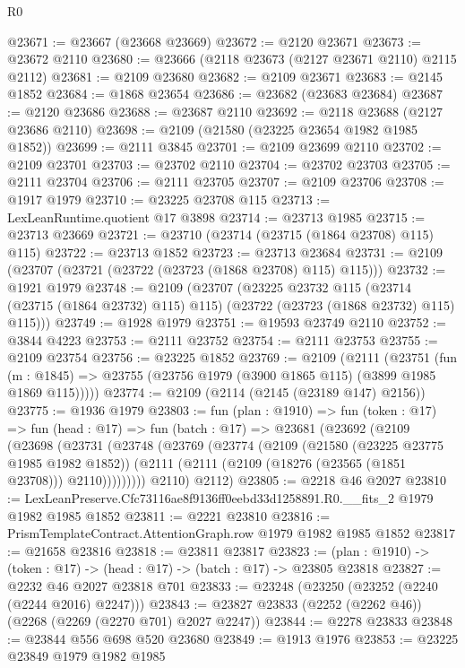 \begin{lexlean}{R0}
\begin{coremodule}
@23671 := @23667 (@23668 @23669)
@23672 := @2120 @23671
@23673 := @23672 @2110
@23680 := @23666 (@2118 @23673 (@2127 @23671 @2110) @2115 @2112)
@23681 := @2109 @23680
@23682 := @2109 @23671
@23683 := @2145 @1852
@23684 := @1868 @23654
@23686 := @23682 (@23683 @23684)
@23687 := @2120 @23686
@23688 := @23687 @2110
@23692 := @2118 @23688 (@2127 @23686 @2110)
@23698 := @2109 (@21580 (@23225 @23654 @1982 @1985 @1852))
@23699 := @2111 @3845
@23701 := @2109 @23699 @2110
@23702 := @2109 @23701
@23703 := @23702 @2110
@23704 := @23702 @23703
@23705 := @2111 @23704
@23706 := @2111 @23705
@23707 := @2109 @23706
@23708 := @1917 @1979
@23710 := @23225 @23708 @115
@23713 := LexLeanRuntime.quotient @17 @3898
@23714 := @23713 @1985
@23715 := @23713 @23669
@23721 := @23710 (@23714 (@23715 (@1864 @23708) @115) @115)
@23722 := @23713 @1852
@23723 := @23713 @23684
@23731 := @2109 (@23707 (@23721 (@23722 (@23723 (@1868 @23708) @115) @115)))
@23732 := @1921 @1979
@23748 := @2109
    (@23707
      (@23225
        @23732
        @115
        (@23714 (@23715 (@1864 @23732) @115) @115)
        (@23722 (@23723 (@1868 @23732) @115) @115)))
@23749 := @1928 @1979
@23751 := @19593 @23749 @2110
@23752 := @3844 @4223
@23753 := @2111 @23752
@23754 := @2111 @23753
@23755 := @2109 @23754
@23756 := @23225 @1852
@23769 := @2109
    (@2111
      (@23751
        (fun (m : @1845) => @23755 (@23756 @1979 (@3900 @1865 @115) (@3899 @1985 @1869 @115)))))
@23774 := @2109 (@2114 (@2145 (@23189 @147) @2156))
@23775 := @1936 @1979
@23803 := fun (plan : @1910) =>
  fun (token : @17) =>
  fun (head : @17) =>
  fun (batch : @17) =>
  @23681
    (@23692
      (@2109
        (@23698
          (@23731
            (@23748
              (@23769
                (@23774
                  (@2109
                    (@21580 (@23225 @23775 @1985 @1982 @1852))
                    (@2111 (@2111 (@2109 (@18276 (@23565 (@1851 @23708))) @2110)))))))))
        @2110)
      @2112)
@23805 := @2218 @46 @2027
@23810 := LexLeanPreserve.Cfc73116ae8f9136ff0eebd33d1258891.R0.__fits_2 @1979 @1982 @1985 @1852
@23811 := @2221 @23810
@23816 := PrismTemplateContract.AttentionGraph.row @1979 @1982 @1985 @1852
@23817 := @21658 @23816
@23818 := @23811 @23817
@23823 := (plan : @1910) -> (token : @17) -> (head : @17) -> (batch : @17) -> @23805 @23818
@23827 := @2232 @46 @2027 @23818 @701
@23833 := @23248 (@23250 (@23252 (@2240 (@2244 @2016) @2247)))
@23843 := @23827 @23833 (@2252 (@2262 @46)) (@2268 (@2269 (@2270 @701) @2027 @2247))
@23844 := @2278 @23833
@23848 := @23844 @556 @698 @520 @23680
@23849 := @1913 @1976
@23853 := @23225 @23849 @1979 @1982 @1985

\end{coremodule}
\end{lexlean}
